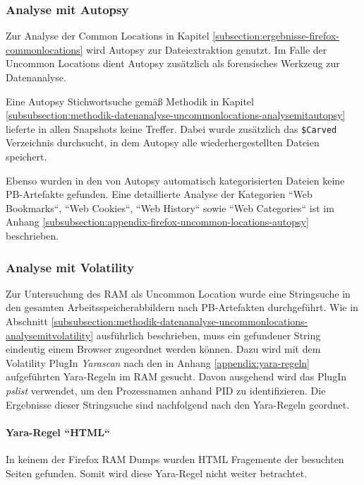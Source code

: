 \subsubsection*{Analyse mit Autopsy}
\label{subsubsection:ergebnisse-firefox-uncommonlocations-analysemitautopsy}
Zur Analyse der Common Locations in Kapitel \ref{subsection:ergebnisse-firefox-commonlocations} wird Autopsy zur Dateiextraktion genutzt. Im Falle der Uncommon Locations dient Autopsy zusätzlich als forensisches Werkzeug zur Datenanalyse.

Eine Autopsy Stichwortsuche gemäß Methodik in Kapitel \ref{subsubsection:methodik-datenanalyse-uncommonlocations-analysemitautopsy} lieferte in allen Snapshots keine Treffer. Dabei wurde zusätzlich das \texttt{\$Carved} Verzeichnis durchsucht, in dem Autopsy alle wiederhergestellten Dateien speichert.

Ebenso wurden in den von Autopsy automatisch kategorisierten Dateien keine PB-Artefakte gefunden. Eine detaillierte Analyse der Kategorien ``Web Bookmarks``, ``Web Cookies``, ``Web History`` sowie ``Web Categories`` ist im Anhang \ref{subsubsection:appendix-firefox-uncommon-locations-autopsy} beschrieben.

\subsubsection*{Analyse mit Volatility}
\label{subsubsection:ergebnisse-firefox-uncommonlocations-analysemitvolatility}
Zur Untersuchung des RAM als Uncommon Location wurde eine Stringsuche in den gesamten Arbeitsspeicherabbildern nach PB-Artefakten durchgeführt.
Wie in Abschnitt \ref{subsubsection:methodik-datenanalyse-uncommonlocations-analysemitvolatility} ausführlich beschrieben, muss ein gefundener String eindeutig einem Browser zugeordnet werden können. 
Dazu wird mit dem Volatility PlugIn \textit{Yarascan} nach den in Anhang \ref{appendix:yara-regeln} aufgeführten Yara-Regeln im RAM gesucht. Davon ausgehend wird das PlugIn \textit{pslist} verwendet, um den Prozessnamen anhand PID zu identifizieren.
Die Ergebnisse dieser Stringsuche sind nachfolgend nach den Yara-Regeln geordnet.

\paragraph*{Yara-Regel ``HTML``}
In keinem der Firefox RAM Dumps wurden HTML Fragemente der besuchten Seiten gefunden. Somit wird diese Yara-Regel nicht weiter betrachtet.

